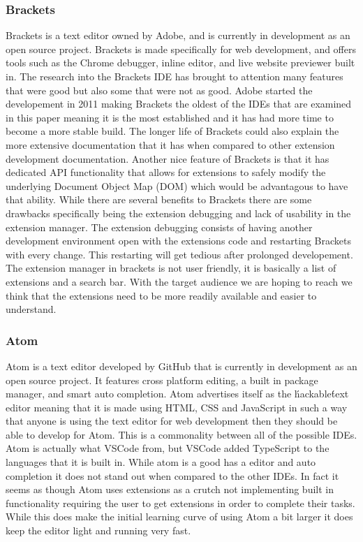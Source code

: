 \documentclass[letterpaper,10pt,titlepage,draftclsnofoot,onecolumn,onesided] {IEEEtran}
\begin{document}
\subsubsection{Brackets}
Brackets is a text editor owned by Adobe, and is currently in development as an open source project. 
Brackets is made specifically for web development, and offers tools such as the Chrome debugger, inline editor, and live website previewer built in.
The research into the Brackets IDE has brought to attention many features that were good but also some that were not as good.
Adobe started the developement in 2011 making Brackets the oldest of the IDEs that are examined in this paper meaning it is the most established and it has had more time to become a more stable build. 
The longer life of Brackets could also explain the more extensive documentation that it has when compared to other extension development documentation.
Another nice feature of Brackets is that it has dedicated API functionality that allows for extensions to safely modify the underlying Document Object Map (DOM) which would be advantagous to have that ability.
While there are several benefits to Brackets there are some drawbacks specifically being the extension debugging and lack of usability in the extension manager. 
The extension debugging consists of having another development environment open with the extensions code and restarting Brackets with every change.
This restarting will get tedious after prolonged developement.
The extension manager in brackets is not user friendly, it is basically a list of extensions and a search bar.
With the target audience we are hoping to reach we think that the extensions need to be more readily available and easier to understand.

\subsubsection{Atom}
Atom is a text editor developed by GitHub that is currently in development as an open source project. 
It features cross platform editing, a built in package manager, and smart auto completion.
Atom advertises itself as the \'hackable\' text editor meaning that it is made using HTML, CSS and JavaScript in such a way that anyone is using the text editor for web development then they should be able to develop for Atom.
This is a commonality between all of the possible IDEs.
Atom is actually what VSCode from, but VSCode added TypeScript to the languages that it is built in.
While atom is a good has a editor and auto completion it does not stand out when compared to the other IDEs. 
In fact it seems as though Atom uses extensions as a crutch not implementing built in functionality requiring the user to get extensions in order to complete their tasks. 
While this does make the initial learning curve of using Atom a bit larger it does keep the editor light and running very fast.
\end{document}
